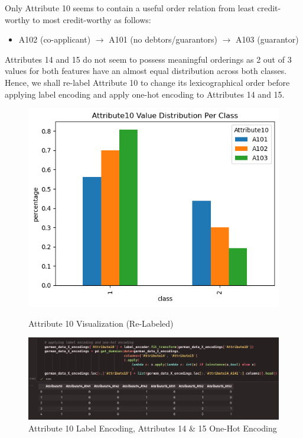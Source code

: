 \documentclass{article}
\begin{document}
    Only Attribute 10 seems to contain a useful order relation from least credit-worthy to most credit-worthy as follows:
    \begin{itemize}
        \item A102 (co-applicant) $\to$ A101 (no debtors/guarantors) $\to$ A103 (guarantor) 
    \end{itemize}
    Attributes 14 and 15 do not seem to possess meaningful orderings as 2 out of 3 values for both features have an almost equal distribution across both classes.
    Hence, we shall re-label Attribute 10 to change its lexicographical order before applying label encoding and apply one-hot encoding to Attributes 14 and 15.
    \begin{figure}[H]
        \centering
        \begin{minipage}[t]{0.35\textwidth}
            \centering
            \includegraphics[width=\textwidth, height=0.2\textheight]{./I_1_g_g.png}
            \caption{Attribute 10 Visualization (Re-Labeled)}
        \end{minipage}
        \hfill
        \begin{minipage}[t]{0.62\textwidth}
            \centering
            \includegraphics[width=\textwidth, height=0.15\textheight]{./I_1_g_h.png}
            \caption{Attribute 10 Label Encoding, Attributes 14 \& 15 One-Hot Encoding}
        \end{minipage}
    \end{figure}
\end{document}
